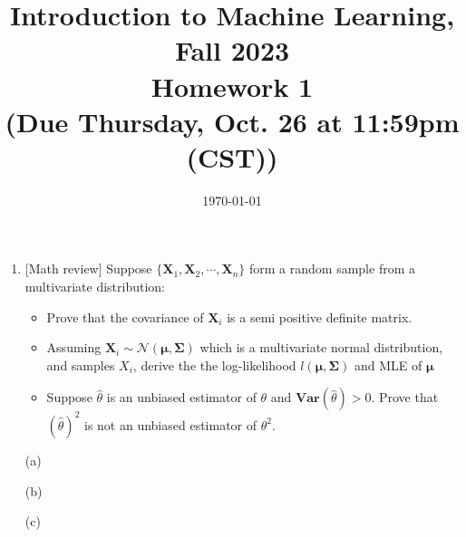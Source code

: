 \documentclass[10pt]{article}
\begin{document}
\date{\today}
\title{Introduction to Machine Learning, Fall 2023 \\
	Homework 1\\
	\small (Due Thursday, Oct. 26 at 11:59pm (CST))}
\maketitle
\begin{enumerate}[1.]


	\item {} [Math review] Suppose $\{\mathbf{X}_1, \mathbf{X}_2, \cdots, \mathbf{X}_n\}$ form a random sample from a multivariate distribution:
	      \begin{itemize}
		      \item[(a)] Prove that the covariance of $\mathbf{X}_i$ is a semi positive definite matrix. ~
		      \item[(b)] Assuming $\mathbf{X}_i\sim \mathcal{N}(\mathbf{\mu},\mathbf{\Sigma})$ which is a multivariate normal distribution, and samples $X_i$, derive the the log-likelihood $\mathit{l}(\mathbf{\mu},\mathbf{\Sigma})$ and MLE of $\mathbf{\mu}$ ~
		      \item[(c)] Suppose $\hat{\theta}$ is an unbiased estimator of $\theta$ and $\mathbf{Var}(\hat{\theta})>0$. Prove that $(\hat{\theta})^2$ is not an unbiased estimator of $\theta^2$. ~
	      \end{itemize}
		
(a)  


(b) 



(c)



	      \newpage


\end{enumerate}
\end{document}
